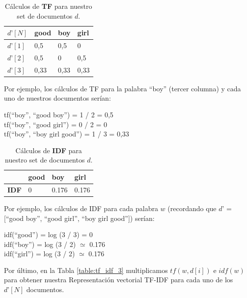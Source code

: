 \documentclass[12pt,a4paper]{article}
\begin{document}
\begin{sloppypar}
\begin{table}[h!]
\centering
\begin{tabular}{|p{1cm}||p{1cm}|p{1cm}|p{1cm}|}
\hline
\centering $d’[N]$ & \textbf{good} & \textbf{boy} & \textbf{girl}  \\ [1ex] 
\hline
$d’[1]$ & 0,5 & 0,5 & 0 \\
\hline
$d’[2]$ & 0,5 & 0 & 0,5 \\
\hline
$d’[3]$ & 0,33 & 0,33 & 0,33 \\
\hline
\end{tabular}
\caption{Cálculos de \textbf{TF} para nuestro set de documentos $d$\cite{NLP_2}.} 
\label{table:tf_idf_1}
\end{table}

Por ejemplo, los cálculos de TF para la palabra “boy” (tercer columna) y cada uno de nuestros documentos serían:

\begin{center}
tf(“boy”, “good boy”) = 1 / 2 = 0,5  \\
tf(“boy”, “good girl”) = 0 / 2 = 0  \\
tf(“boy”, “boy girl good”) = 1 / 3 = 0,33  \\
\end{center}

\begin{table}[h!]
\centering
\begin{tabular}{|p{1cm}||p{1cm}|p{1cm}|p{1cm}|}
\hline
& \textbf{good} & \textbf{boy} & \textbf{girl}  \\ [1ex] 
\hline
\textbf{IDF} & 0  & 0.176 & 0.176  \\
\hline
\end{tabular}
\caption{Cálculos de \textbf{IDF} para nuestro set de documentos $d$\cite{NLP_2}.} 
\label{table:tf_idf_2}
\end{table}

Por ejemplo, los cálculos de IDF para cada palabra $w$ (recordando que $d’$ = [“good boy”, “good girl”, “boy girl good”]) serían:

\begin{center}
idf(“good”) = log (3 / 3) = 0  \\
idf(“boy”) = log (3 / 2) $\simeq$ 0.176  \\
idf(“girl”) = log (3 / 2) $\simeq$ 0.176  \\
\end{center}

Por último, en la Tabla \ref{table:tf_idf_3} multiplicamos $tf (w,d[i])$ e $idf(w)$ para obtener nuestra Representación vectorial TF-IDF para cada uno de los $d’[N]$ documentos.


\end{sloppypar}
\end{document}
